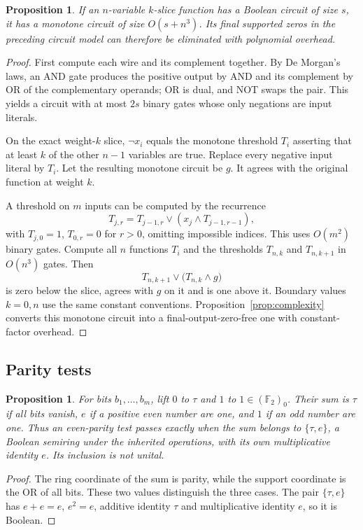 \documentclass[11pt]{article}
\newcommand{\F}{\mathbb F}
\newtheorem{proposition}[theorem]{Proposition}
\theoremstyle{definition}
\theoremstyle{remark}
\begin{document}
\begin{proposition}\label{prop:slice}
If an $n$-variable $k$-slice function has a Boolean circuit of size $s$, it has a monotone circuit of size $O(s+n^3)$. Its final supported zeros in the preceding circuit model can therefore be eliminated with polynomial overhead.
\end{proposition}
\begin{proof}
First compute each wire and its complement together. By De Morgan's laws, an AND gate produces the positive output by AND and its complement by OR of the complementary operands; OR is dual, and NOT swaps the pair. This yields a circuit with at most $2s$ binary gates whose only negations are input literals.

On the exact weight-$k$ slice, $\neg x_i$ equals the monotone threshold $T_i$ asserting that at least $k$ of the other $n-1$ variables are true. Replace every negative input literal by $T_i$. Let the resulting monotone circuit be $g$. It agrees with the original function at weight $k$.

A threshold on $m$ inputs can be computed by the recurrence
\[
 T_{j,r}=T_{j-1,r}\vee(x_j\wedge T_{j-1,r-1}),
\]
with $T_{j,0}=1$, $T_{0,r}=0$ for $r>0$, omitting impossible indices. This uses $O(m^2)$ binary gates. Compute all $n$ functions $T_i$ and the thresholds $T_{n,k}$ and $T_{n,k+1}$ in $O(n^3)$ gates. Then
\[
 T_{n,k+1}\vee\bigl(T_{n,k}\wedge g\bigr)
\]
is zero below the slice, agrees with $g$ on it and is one above it. Boundary values $k=0,n$ use the same constant conventions. Proposition~\ref{prop:complexity} converts this monotone circuit into a final-output-zero-free one with constant-factor overhead.
\end{proof}

\subsection{Parity tests}
\begin{proposition}\label{prop:parity}
For bits $b_1,\ldots,b_m$, lift $0$ to $\tau$ and $1$ to $1\in(\F_2)_0$. Their sum is $\tau$ if all bits vanish, $e$ if a positive even number are one, and $1$ if an odd number are one. Thus an even-parity test passes exactly when the sum belongs to $\{\tau,e\}$, a Boolean semiring under the inherited operations, with its own multiplicative identity $e$. Its inclusion is not unital.
\end{proposition}
\begin{proof}
The ring coordinate of the sum is parity, while the support coordinate is the OR of all bits. These two values distinguish the three cases. The pair $\{\tau,e\}$ has $e+e=e$, $e^2=e$, additive identity $\tau$ and multiplicative identity $e$, so it is Boolean.
\end{proof}
\end{document}
